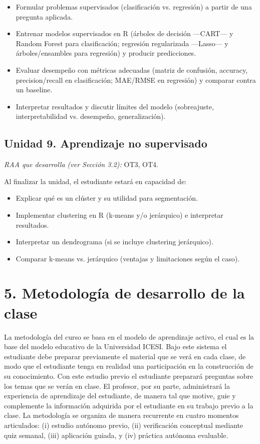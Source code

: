 \documentclass[11pt,a4paper]{article}
\begin{document}
\begin{itemize}
    \item Formular problemas supervisados (clasificación vs. regresión) a partir de una pregunta aplicada.
    \item Entrenar modelos supervisados en R (árboles de decisión ---CART--- y Random Forest para clasificación; regresión regularizada ---Lasso--- y árboles/ensambles para regresión) y producir predicciones.
    \item Evaluar desempeño con métricas adecuadas (matriz de confusión, accuracy, precision/recall en clasificación; MAE/RMSE en regresión) y comparar contra un baseline.
    \item Interpretar resultados y discutir límites del modelo (sobreajuste, interpretabilidad vs. desempeño, generalización).
\end{itemize}

\subsection*{Unidad 9. Aprendizaje no supervisado}

\textit{RAA que desarrolla (ver Sección 3.2):} OT3, OT4.

Al finalizar la unidad, el estudiante estará en capacidad de:

\begin{itemize}
    \item Explicar qué es un clúster y su utilidad para segmentación.
    \item Implementar clustering en R (k-means y/o jerárquico) e interpretar resultados.
    \item Interpretar un dendrograma (si se incluye clustering jerárquico).
    \item Comparar k-means vs. jerárquico (ventajas y limitaciones según el caso).
\end{itemize}


\section*{5. Metodología de desarrollo de la clase}

La metodología del curso se basa en el modelo de aprendizaje activo, el cual es la base del modelo educativo de la Universidad ICESI. Bajo este sistema el estudiante debe preparar previamente el material que se verá en cada clase, de modo que el estudiante tenga en realidad una participación en la construcción de su conocimiento. Con este estudio previo el estudiante preparará preguntas sobre los temas que se verán en clase. El profesor, por su parte, administrará la experiencia de aprendizaje del estudiante, de manera tal que motive, guie y complemente la información adquirida por el estudiante en su trabajo previo a la clase. La metodología se organiza de manera recurrente en cuatro momentos articulados: (i) estudio autónomo previo, (ii) verificación conceptual mediante quiz semanal, (iii) aplicación guiada, y (iv) práctica autónoma evaluable.
\end{document}
